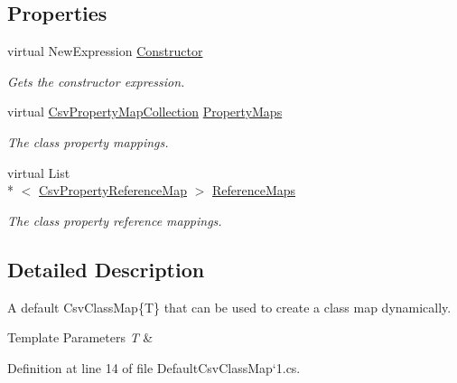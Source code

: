 \subsection*{Properties}
\begin{DoxyCompactItemize}
\item 
virtual New\-Expression \hyperlink{a00060_ae8038b36db7584ef1a73852fcc46404b}{Constructor}
\begin{DoxyCompactList}\small\item\em Gets the constructor expression. \end{DoxyCompactList}\item 
virtual \hyperlink{a00071}{Csv\-Property\-Map\-Collection} \hyperlink{a00060_a9580e897abcba144f3101eb983348e25}{Property\-Maps}
\begin{DoxyCompactList}\small\item\em The class property mappings. \end{DoxyCompactList}\item 
virtual List\\*
$<$ \hyperlink{a00075}{Csv\-Property\-Reference\-Map} $>$ \hyperlink{a00060_a6dfbf8f743b16d2ec83edef865ea2d9e}{Reference\-Maps}
\begin{DoxyCompactList}\small\item\em The class property reference mappings. \end{DoxyCompactList}\end{DoxyCompactItemize}


\subsection{Detailed Description}
A default Csv\-Class\-Map\{\-T\} that can be used to create a class map dynamically. 


\begin{DoxyTemplParams}{Template Parameters}
{\em T} & \\
\hline
\end{DoxyTemplParams}


Definition at line 14 of file Default\-Csv\-Class\-Map`1.\-cs.



